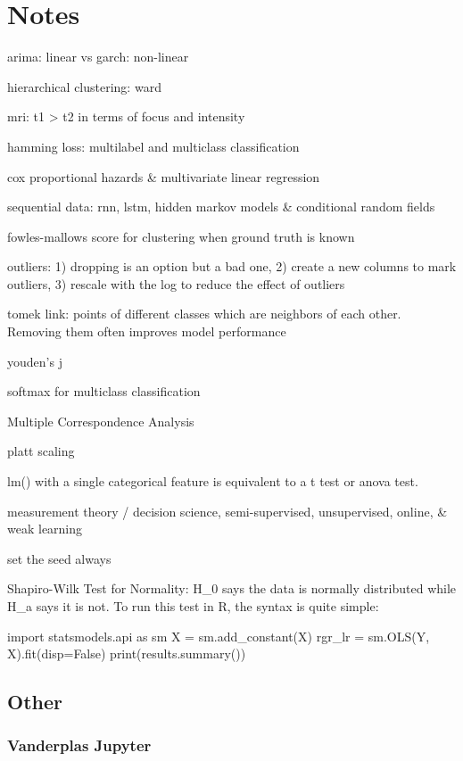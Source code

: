 \documentclass[]{book}
\begin{document}
\chapter{Notes}\label{notes-1}

arima: linear vs garch: non-linear

hierarchical clustering: ward

mri: t1 \textgreater{} t2 in terms of focus and intensity

hamming loss: multilabel and multiclass classification

cox proportional hazards \& multivariate linear regression

sequential data: rnn, lstm, hidden markov models \& conditional random
fields

fowles-mallows score for clustering when ground truth is known

outliers: 1) dropping is an option but a bad one, 2) create a new
columns to mark outliers, 3) rescale with the log to reduce the effect
of outliers

tomek link: points of different classes which are neighbors of each
other. Removing them often improves model performance

youden's j

softmax for multiclass classification

Multiple Correspondence Analysis

platt scaling

lm() with a single categorical feature is equivalent to a t test or
anova test.

measurement theory / decision science, semi-supervised, unsupervised,
online, \& weak learning

set the seed always

Shapiro-Wilk Test for Normality: H\_0 says the data is normally
distributed while H\_a says it is not. To run this test in R, the syntax
is quite simple:

import statsmodels.api as sm X = sm.add\_constant(X) rgr\_lr = sm.OLS(Y,
X).fit(disp=False) print(results.summary())

\section{Other}\label{other-3}

\subsection{Vanderplas Jupyter}\label{vanderplas-jupyter}
\end{document}
